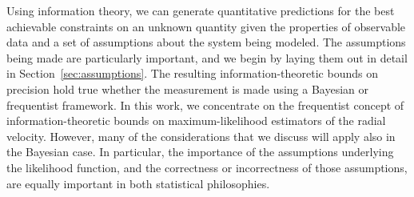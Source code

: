 \documentclass[modern]{aastex631}
\newcommand{\documentname}{\textsl{Article}}
\newcommand{\sectionname}{Section}
\newcommand{\secref}[1]{\sectionname~\ref{#1}}
\newcommand{\pdf}{pdf} %
\begin{document}
Using information theory, we can generate quantitative predictions for the best achievable constraints on an unknown quantity given the properties of observable data and a set of assumptions about the system being modeled.
The assumptions being made are particularly important, and we begin by laying them out in detail in \secref{sec:assumptions}.
The resulting information-theoretic bounds on precision hold true whether the measurement is made using a Bayesian or frequentist framework. %
In this work, we concentrate on the frequentist concept of information-theoretic bounds on maximum-likelihood estimators of the radial velocity. 
However, many of the considerations that we discuss will apply also in the Bayesian case. 
In particular, the importance of the assumptions underlying the likelihood function, and the correctness or incorrectness of those assumptions, are equally important in both statistical philosophies.


\end{document}
